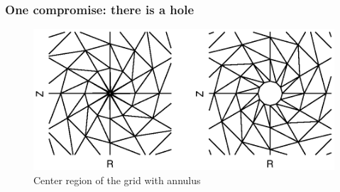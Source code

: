 \documentclass{beamer}
\begin{document}
\begin{frame}
\frametitle{One compromise: there is a hole}
\vspace{-1.2cm}
		\begin{center}
			\begin{figure}
				\includegraphics[trim={1cm 2cm 1cm 2cm},clip,width=1\textwidth]{FIGURES/Comparison_smin_annulus.eps}
				\caption{Center region of the grid with annulus}
			\end{figure}
		\end{center}
\end{frame}
\end{document}
